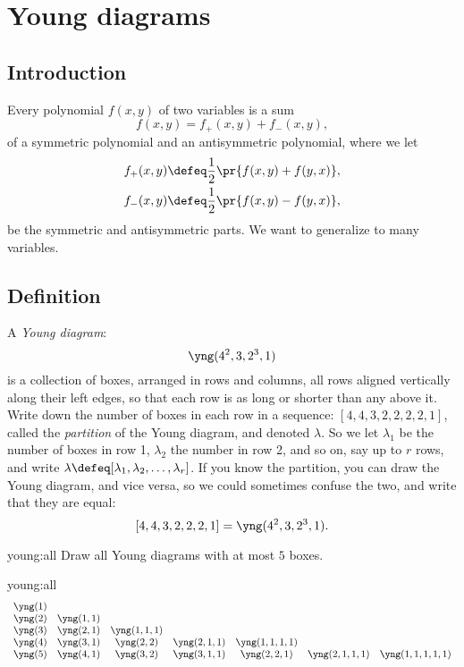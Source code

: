 \chapter{Young diagrams}

\section{Introduction}
Every polynomial \(f(x,y)\) of two variables is a sum
\[
f(x,y) = f_+(x,y) + f_-(x,y),
\]
of a symmetric polynomial and an antisymmetric polynomial, where we let
\begin{align*}
f_+(x,y)&\defeq \frac{1}{2}\pr{f(x,y)+f(y,x)},\\
f_-(x,y)&\defeq \frac{1}{2}\pr{f(x,y)-f(y,x)},
\end{align*}
be the symmetric and antisymmetric parts.
We want to generalize to many variables.

\section{Definition}
A \emph{Young diagram}:
\[
\yng(4^2,3,2^3,1)
\]
is a collection of boxes, arranged in rows and columns, all rows aligned vertically along their left edges, so that each row is as long or shorter than any above it.
Write down the number of boxes in each row in a sequence: \([4,4,3,2,2,2,2,1]\), called the \emph{partition} of the Young diagram, and denoted \(\lambda\).
So we let \(\lambda_1\) be the number of boxes in row 1, \(\lambda_2\) the number in row 2, and so on, say up to \(r\) rows, and write \(\lambda\defeq [\lambda_1,\lambda_2,\dots,\lambda_r]\).
If you know the partition, you can draw the Young diagram, and vice versa, so we could sometimes confuse the two, and write that they are equal:
\[
[4,4,3,2,2,2,1]=\yng(4^2,3,2^3,1).
\]

\begin{problem}{young:all}
Draw all Young diagrams with at most \(5\) boxes.
\end{problem}
\begin{answer}{young:all}
{
\arraycolsep=1.4pt\def\arraystretch{2.2}
\setlength{\arraycolsep}{10pt}
\[
\begin{array}{ccccccccccc}
\yng(1)\\
\yng(2)&\yng(1,1)\\
\yng(3)&\yng(2,1)&\yng(1,1,1)\\
\yng(4)&\yng(3,1)&\yng(2,2)&\yng(2,1,1)&\yng(1,1,1,1)\\
\yng(5)&\yng(4,1)&\yng(3,2)&\yng(3,1,1)&\yng(2,2,1)&\yng(2,1,1,1)&\yng(1,1,1,1,1)
\end{array}
\]
}
\end{answer}

